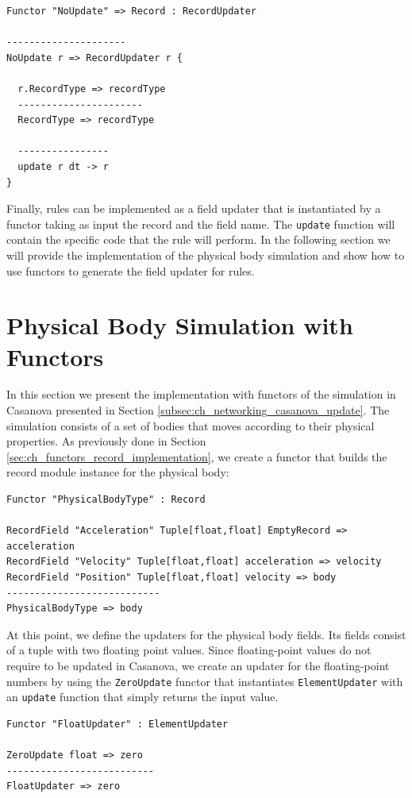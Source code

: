 \begin{lstlisting}
Functor "NoUpdate" => Record : RecordUpdater

---------------------
NoUpdate r => RecordUpdater r {

  r.RecordType => recordType
  ----------------------
  RecordType => recordType
  
  ----------------
  update r dt -> r
}
\end{lstlisting}

\noindent
Finally, rules can be implemented as a field updater that is instantiated by a functor taking as input the record and the field name. The \texttt{update} function will contain the specific code that the rule will perform. In the following section we will provide the implementation of the physical body simulation and show how to use functors to generate the field updater for rules.

\section{Physical Body Simulation with Functors}
\label{subsec:ch_networking_simulation}
In this section we present the implementation with functors of the simulation in Casanova presented in Section \ref{subsec:ch_networking_casanova_update}. The simulation consists of a set of bodies that moves according to their physical properties. As previously done in Section \ref{sec:ch_functors_record_implementation}, we create a functor that builds the record module instance for the physical body:

\begin{lstlisting}
Functor "PhysicalBodyType" : Record

RecordField "Acceleration" Tuple[float,float] EmptyRecord => acceleration
RecordField "Velocity" Tuple[float,float] acceleration => velocity
RecordField "Position" Tuple[float,float] velocity => body
---------------------------
PhysicalBodyType => body
\end{lstlisting}

\noindent
At this point, we define the updaters for the physical body fields. Its fields consist of a tuple with two floating point values. Since floating-point values do not require to be updated in Casanova, we create an updater for the floating-point numbers by using the \texttt{ZeroUpdate} functor that instantiates \texttt{ElementUpdater} with an \texttt{update} function that simply returns the input value.

\begin{lstlisting}
Functor "FloatUpdater" : ElementUpdater

ZeroUpdate float => zero
--------------------------
FloatUpdater => zero
\end{lstlisting}

